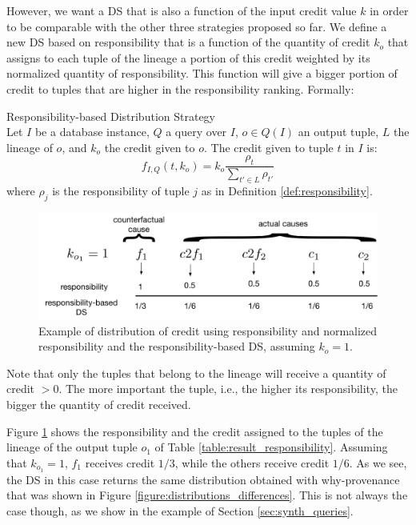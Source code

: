 However, we want a DS that is also a function of the input credit value $k$ in order to be comparable with the other three strategies proposed so far.
We define a new DS based on responsibility that is a function of the quantity of credit $k_o$ that assigns to each tuple of the lineage a portion of this credit weighted by its normalized quantity of responsibility.
This function will give a bigger portion of credit to tuples that are higher in the responsibility ranking.
Formally:
\newline
\begin{definition}{Responsibility-based Distribution Strategy}\\
\label{def:resp_ds}
Let $I$ be a database instance, $Q$ a query over $I$, $o \in Q(I)$ an output tuple, $L$ the lineage of $o$, and $k_o$ the credit given to $o$. The credit given to tuple $t$ in $I$ is:
\[
	f_{I, Q}(t, k_o) = k_o \frac{\rho_t}{\sum_{t' \in L} \rho_{t'}}
\]
where $\rho_j$ is the responsibility of tuple $j$ as in Definition \ref{def:responsibility}.
\end{definition}


\begin{figure}[]
\centering
  \includegraphics[width=.7\textwidth]{figures/resp_example}
  \caption{Example of distribution of credit using responsibility and normalized responsibility and the responsibility-based DS, assuming $k_o = 1$.}
  \label{fig:resp_example}
\end{figure}

Note that only the tuples that belong to the lineage will receive a quantity of credit $> 0$. The more important the tuple, i.e., the higher its responsibility, the bigger the quantity of credit received. 

Figure \ref{fig:resp_example} shows the responsibility and the credit assigned to the tuples of the lineage of the output tuple $o_1$ of Table \ref{table:result_responsibility}. 
Assuming that $k_{o_1} = 1$, $f_1$ receives credit $1/3$, while the others receive credit $1/6$. 
As we see, the DS in this case returns the same distribution obtained with why-provenance that was shown in Figure \ref{figure:distributions_differences}.
This is not always the case though, as we show in the example of Section \ref{sec:synth_queries}.









